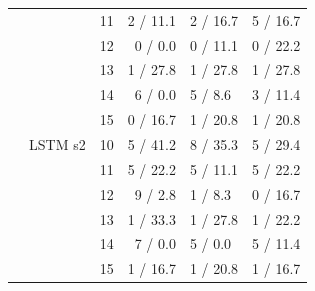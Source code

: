 \begin{scriptsize}
\begin{longtable}{lllrll}
 &  & 11 & 2 / 11.1 & 2 / 16.7 & 5 / 16.7 \\
 &  & 12 & 0 / 0.0 & 0 / 11.1 & 0 / 22.2 \\
 &  & 13 & 1 / 27.8 & 1 / 27.8 & 1 / 27.8 \\
 &  & 14 & 6 / 0.0 & 5 / 8.6 & 3 / 11.4 \\
 &  & 15 & 0 / 16.7 & 1 / 20.8 & 1 / 20.8 \\
 & LSTM s2 & 10 & 5 / 41.2 & 8 / 35.3 & 5 / 29.4 \\
 &  & 11 & 5 / 22.2 & 5 / 11.1 & 5 / 22.2 \\
 &  & 12 & 9 / 2.8 & 1 / 8.3 & 0 / 16.7 \\
 &  & 13 & 1 / 33.3 & 1 / 27.8 & 1 / 22.2 \\
 &  & 14 & 7 / 0.0 & 5 / 0.0 & 5 / 11.4 \\
 &  & 15 & 1 / 16.7 & 1 / 20.8 & 1 / 16.7 \\
\end{longtable}
\end{scriptsize}
